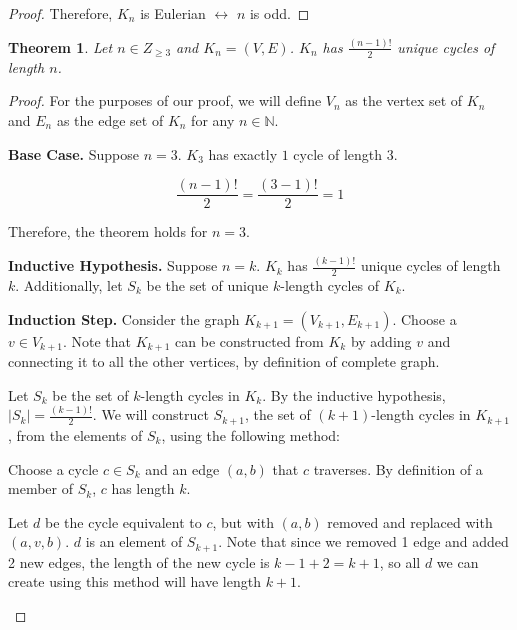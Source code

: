 \documentclass{article}
\newtheorem{theorem}{Theorem}
\begin{document}
\begin{outline}[enumerate]
\begin{proof}
        Therefore, $K_n$ is Eulerian $\leftrightarrow$ $n$ is odd.

    \end{proof}
    \1 \begin{theorem}
        Let $n \in Z_{\geq 3}$ and $K_n = (V, E)$. $K_n$ has $\frac{(n - 1)!}{2}$ unique cycles of length $n$.
    \end{theorem}
    \begin{proof}
        For the purposes of our proof, we will define $V_n$ as the vertex set of $K_n$ and $E_n$ as the edge set of $K_n$ for any $n \in \mathbb{N}$.

        \textbf{Base Case.} Suppose $n = 3$. $K_3$ has exactly $1$ cycle of length $3$. 

        \begin{equation}
            \frac{(n - 1)!}{2} = \frac{(3 - 1)!}{2} = 1
        \end{equation}

        Therefore, the theorem holds for $n = 3$.

        \textbf{Inductive Hypothesis.} Suppose $n = k$. $K_k$ has $\frac{(k - 1)!}{2}$ unique cycles of length $k$. Additionally, let $S_k$ be the set of unique $k$-length cycles of $K_k$.

        \textbf{Induction Step.} Consider the graph $K_{k + 1} = (V_{k+1}, E_{k+1})$. Choose a $v \in V_{k+1}$. Note that $K_{k+1}$ can be constructed from $K_k$ by adding $v$ and connecting it to all the other vertices, by definition of complete graph.

        Let $S_k$ be the set of $k$-length cycles in $K_k$. By the inductive hypothesis, $|S_k| = \frac{(k - 1)!}{2}$. We will construct $S_{k+1}$, the set of $(k+1)$-length cycles in $K_{k+1}$, from the elements of $S_k$, using the following method:

        \begin{adjustwidth}{0.5cm}{0cm}
            Choose a cycle $c \in S_k$ and an edge $(a, b)$ that $c$ traverses. By definition of a member of $S_k$, $c$ has length $k$. 
            
            Let $d$ be the cycle equivalent to $c$, but with $(a, b)$ removed and replaced with $(a, v, b)$. $d$ is an element of $S_{k+1}$. Note that since we removed 1 edge and added 2 new edges, the length of the new cycle is $k - 1 + 2 = k + 1$, so all $d$ we can create using this method will have length $k + 1$.
        \end{adjustwidth}


\end{proof}
\end{outline}
\end{document}
